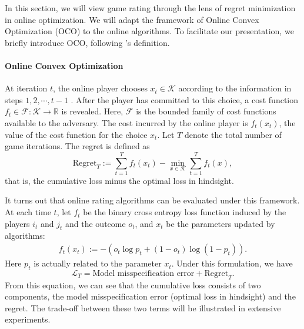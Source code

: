 
In this section, we will view game rating through the lens of regret minimization in online optimization. We will adapt the framework of Online Convex Optimization (OCO) to the online algorithms. To facilitate our presentation, we briefly introduce OCO, following \citet{hazan2016introduction}'s definition.

\paragraph{Online Convex Optimization} At iteration $t$, the online player chooses $x_t \in \mathcal{K}$ according to the information in steps $1,2, \cdots, t-1$ . After the player has committed to this choice, a cost function $f_t \in \mathcal{F} : \mathcal{K} \to \mathbb{R}$ is revealed. Here, $\mathcal{F}$ is the bounded family of cost functions available to the adversary. The cost incurred by the online player is $f_t(x_t)$, the value of the cost function for the choice $x_t$. Let $T$ denote the total number of game iterations. The regret is defined as
\begin{equation*}
    \text{Regret}_T := \sum_{t=1}^{T}f_t(x_t) - \min_{x \in \mathcal{K}} \sum_{t=1}^{T} f_t(x),
\end{equation*}
that is, the cumulative loss minus the optimal loss in hindsight. 

It turns out that online rating algorithms can be evaluated under this framework. At each time $t$, let $f_t$ be the binary cross entropy loss function induced by the players $i_t$ and $j_t$ and the outcome $o_t$, and $x_t$ be the parameters updated by algorithms:
\begin{align*}
    f_t(x_t) := - (o_t \log  p_t + (1-o_t) \log (1-p_t)) .
\end{align*}
Here $p_t$ is actually related to the parameter $x_t$. Under this formulation, we have
\begin{equation}
\mathcal{L}_T = \text{Model misspecification error} + \text{Regret}_T.
\end{equation}
From this equation, we can see that the cumulative loss consists of two components, the model misspecification error (optimal loss in hindsight) and the regret. The trade-off between these two terms will be illustrated in extensive experiments.



